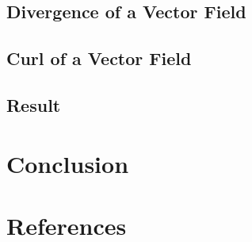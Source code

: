 \documentclass[12pt]{article}
\begin{document}
\subsection{Divergence of a Vector Field}



\subsection{Curl of a Vector Field}



\subsection{Result}



\newpage
\section{Conclusion}



\newpage
\section{References}


\nocite{El-Deeb_PEU-218_Assignments}
\end{document}

